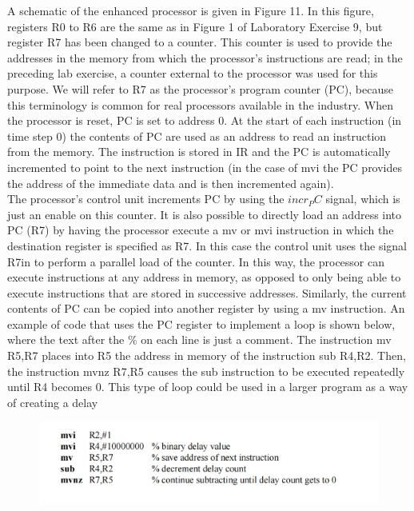 A schematic of the enhanced processor is given in Figure 11. In this figure, registers R0 to R6 are the same
as in Figure 1 of Laboratory Exercise 9, but register R7 has been changed to a counter. This counter is used
to provide the addresses in the memory from which the processor’s instructions are read; in the preceding lab
exercise, a counter external to the processor was used for this purpose. We will refer to R7 as the processor’s
program counter (PC), because this terminology is common for real processors available in the industry. When
the processor is reset, PC is set to address 0. At the start of each instruction (in time step 0) the contents of PC
are used as an address to read an instruction from the memory. The instruction is stored in IR and the PC is
automatically incremented to point to the next instruction (in the case of mvi the PC provides the address of the
immediate data and is then incremented again).\\
The processor’s control unit increments PC by using the $incr_PC$ signal, which is just an enable on this counter. It
is also possible to directly load an address into PC (R7) by having the processor execute a mv or mvi instruction
in which the destination register is specified as R7. In this case the control unit uses the signal R7in to perform
a parallel load of the counter. In this way, the processor can execute instructions at any address in memory, as
opposed to only being able to execute instructions that are stored in successive addresses. Similarly, the current
contents of PC can be copied into another register by using a mv instruction. An example of code that uses the
PC register to implement a loop is shown below, where the text after the \% on each line is just a comment. The
instruction mv R5,R7 places into R5 the address in memory of the instruction sub R4,R2. Then, the instruction
mvnz R7,R5 causes the sub instruction to be executed repeatedly until R4 becomes 0. This type of loop could be
used in a larger program as a way of creating a delay\\
\begin{figure}[h]
    \centering
    \includegraphics[scale = 0.6]{source/picture/Lab10/pic2.png}
\end{figure}
